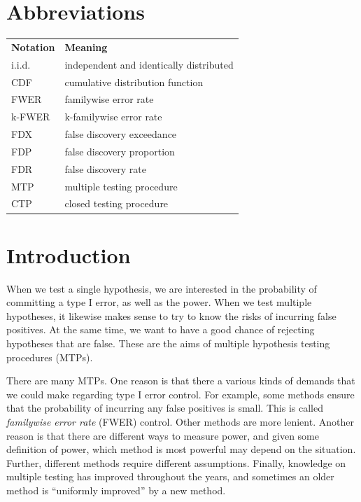 \documentclass[11pt]{article}
\theoremstyle{plain}
\theoremstyle{definition}
\begin{document}
\newpage
\section*{Abbreviations}
\begin{tabular}{ll}
\textbf{Notation} & \textbf{Meaning} \\
i.i.d. & independent and identically distributed \\
CDF  & cumulative distribution function\\
FWER & familywise error rate\\
k-FWER & k-familywise error rate\\
FDX & false discovery exceedance\\
FDP & false discovery proportion\\
FDR & false discovery rate\\
MTP & multiple testing procedure\\
CTP & closed testing procedure\\

\end{tabular}
\newpage
{}

\section{Introduction}
When we test a single hypothesis,  we are interested in the probability of committing a type I error, as well as the power. When we test multiple hypotheses,  it likewise makes sense to try  to know the risks of incurring false positives. At the same time, we want  to have a good chance of rejecting hypotheses that are false. These are the aims of  multiple hypothesis testing procedures (MTPs).

There are many MTPs. One reason is that there a various kinds of demands that we could make regarding type I error control. For example, some methods ensure that the probability of incurring any false positives is small. This is called \emph{familywise error rate} (FWER) control. Other methods are more lenient. Another reason is that there are different ways to measure power, and given some definition of power, which method is most powerful may depend on the situation. Further, different methods require different assumptions. Finally, knowledge on multiple testing has improved throughout the years, and sometimes an older method is ``uniformly improved'' by a new method. 
\end{document}
